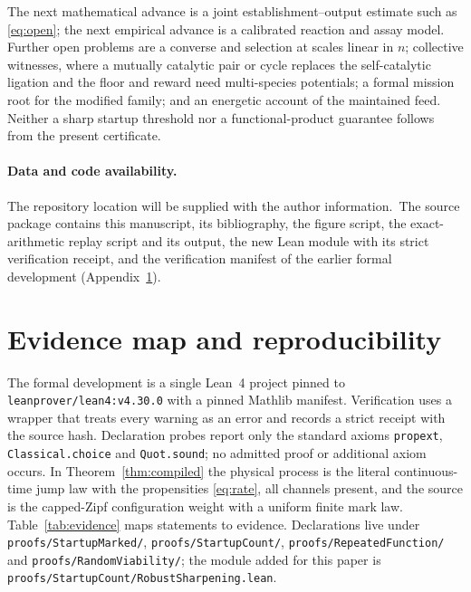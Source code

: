 \documentclass[11pt,letterpaper]{article}
\newcommand{\RepositoryNote}{The repository location will be supplied with the author information.}
\theoremstyle{plain}
\theoremstyle{definition}
\theoremstyle{remark}
\numberwithin{equation}{section}
\begin{document}
The next mathematical advance is a joint establishment--output estimate such as \eqref{eq:open}; the next empirical advance is a calibrated reaction and assay model. Further open problems are a converse and selection at scales linear in $n$; collective witnesses, where a mutually catalytic pair or cycle replaces the self-catalytic ligation and the floor and reward need multi-species potentials; a formal mission root for the modified family; and an energetic account of the maintained feed. Neither a sharp startup threshold nor a functional-product guarantee follows from the present certificate.

\paragraph{Data and code availability.}
\RepositoryNote\ The source package contains this manuscript, its bibliography, the figure script, the exact-arithmetic replay script and its output, the new Lean module with its strict verification receipt, and the verification manifest of the earlier formal development (Appendix~\ref{app:formal}).

\appendix
\section{Evidence map and reproducibility}\label{app:formal}

The formal development is a single Lean~4 project pinned to \texttt{leanprover/lean4:v4.30.0} with a pinned Mathlib manifest. Verification uses a wrapper that treats every warning as an error and records a strict receipt with the source hash. Declaration probes report only the standard axioms \texttt{propext}, \texttt{Classical.choice} and \texttt{Quot.sound}; no admitted proof or additional axiom occurs. In Theorem~\ref{thm:compiled} the physical process is the literal continuous-time jump law with the propensities \eqref{eq:rate}, all channels present, and the source is the capped-Zipf configuration weight with a uniform finite mark law. Table~\ref{tab:evidence} maps statements to evidence. Declarations live under \texttt{proofs/StartupMarked/}, \texttt{proofs/StartupCount/}, \texttt{proofs/RepeatedFunction/} and \texttt{proofs/RandomViability/}; the module added for this paper is \texttt{proofs/StartupCount/RobustSharpening.lean}.
\end{document}
